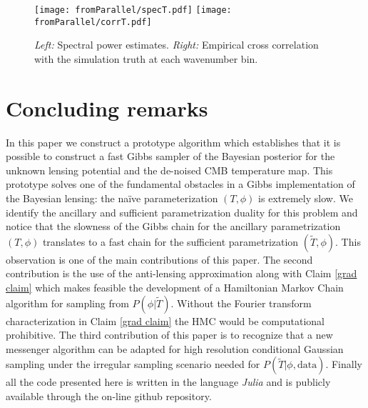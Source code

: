 \documentclass[noinfoline]{imsart}
\begin{document}
\begin{figure}[h]
{\texttt{[image: fromParallel/specT.pdf]}}%
{\texttt{[image: fromParallel/corrT.pdf]}}
\caption{{\em Left:} Spectral power estimates. {\em Right:} Empirical cross correlation with the simulation truth at each wavenumber bin.}
\label{t spec fig}
\end{figure}






%
%
\section{Concluding remarks}

In this paper we construct a prototype algorithm which establishes that it is possible to construct a fast Gibbs sampler of the Bayesian posterior for the unknown lensing potential and the de-noised CMB temperature map. This prototype solves one of the fundamental obstacles in a Gibbs implementation of the Bayesian lensing: the na\"ive parameterization $(T, \phi)$ is extremely slow. We identify the ancillary and sufficient parametrization duality for this problem and notice that the slowness of the Gibbs chain for the ancillary parametrization  $(T, \phi)$ translates to a fast chain for the sufficient parametrization  $(\widetilde T, \phi)$. This observation is one of the main contributions of this paper. The second contribution is the use of the anti-lensing approximation along with Claim \ref{grad claim} which makes feasible the development of a Hamiltonian Markov Chain algorithm for sampling from  $P(\phi | \widetilde T)$. Without the Fourier transform characterization in Claim \ref{grad claim} the HMC would be computational prohibitive. The third contribution of this paper is to recognize that a new messenger algorithm \cite{elsner2013efficient,jasche2014matrix} can be adapted for high resolution conditional Gaussian sampling under the irregular sampling scenario needed for $P(\widetilde T|\phi, \text{data})$.  Finally all the code presented here is written in the language {\em Julia} \cite{bezanson2012julia}  and is publicly available through the on-line github repository.  

\end{document}
